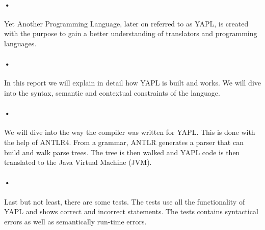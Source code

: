 \paragraph{•}
Yet Another Programming Language, later on referred to as YAPL, is created with the purpose to gain a better understanding of translators and programming languages. 
\paragraph{•}
In this report we will explain in detail how YAPL is built and works. We will dive into the syntax, semantic and contextual constraints of the language.
\paragraph{•}
We will dive into the way the compiler was written for YAPL. This is done with the help of ANTLR4. From a grammar, ANTLR generates a parser that can build and walk parse trees. The tree is then walked and YAPL code is then translated to the Java Virtual Machine (JVM).
\paragraph{•}
Last but not least, there are some tests. The tests use all the functionality of YAPL and shows correct and incorrect statements. The tests contains syntactical errors as well as semantically run-time errors.